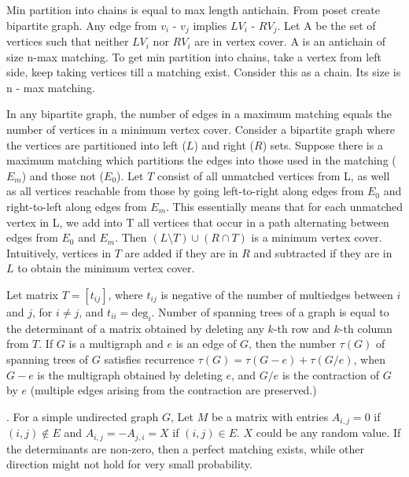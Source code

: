  Min partition into chains is equal to max length antichain. From poset create bipartite graph. Any edge from $v_{i}$ - $v_{j}$ implies  $LV_{i}$ - $RV_{j}$. Let A be the set of vertices such that neither $LV_{i}$ nor $RV_{i}$ are in vertex cover. A is an antichain of size n-max matching. To get min partition into chains, take a vertex from left side, keep taking vertices till a matching exist. Consider this as a chain. Its size is n - max matching.
\vspace{-3mm}
 
 In any bipartite graph, the number of edges in a maximum matching equals the number of vertices in a minimum vertex cover.
Consider a bipartite graph where the vertices are partitioned into left ($L$) and right ($R$) sets. Suppose there is a maximum matching which partitions the edges into those used in the matching ($E_m$) and those not ($E_0$). Let $T$ consist of all unmatched vertices from L, as well as all vertices reachable from those by going left-to-right along edges from $E_0$ and right-to-left along edges from $E_m$. This essentially means that for each unmatched vertex in L, we add into T all vertices that occur in a path alternating between edges from $E_0$ and $E_m$.
Then $(L \setminus T) \cup (R \cap T)$ is a minimum vertex cover. Intuitively, vertices in $T$ are added if they are in $R$ and subtracted if they are in $L$ to obtain the minimum vertex cover.
\vspace{-3mm}
 
 Let matrix $T = [t_{ij}]$, where $t_{ij}$ is negative of the number of
multiedges between $i$ and $j$, for $i \ne j$, and $t_{ii} = \mbox{deg}_i$.
Number of spanning trees of a graph is equal to the determinant of
a matrix obtained by deleting any $k$-th row and $k$-th column from $T$.
If $G$ is a multigraph and $e$ is an edge of $G$, then the number $\tau(G)$ of
spanning trees of $G$ satisfies recurrence $\tau(G) = \tau(G-e) + \tau(G/e)$,
when $G-e$ is the multigraph obtained by deleting $e$, and $G/e$ is
the contraction of $G$ by $e$ (multiple edges arising from the contraction
are preserved.)

. For a simple undirected graph $G$, Let $M$ be a matrix with entries $A_{i, j} = 0$ if $(i, j) \notin E$ and $A_{i, j} = -A_{j, i} = X$ if $(i, j) \in E$. $X$ could be any random value. If the determinants are non-zero, then a perfect matching exists, while other direction might not hold for very small probability.\\


